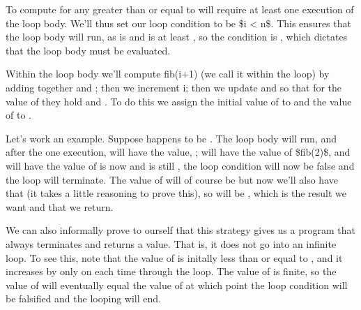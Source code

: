 \documentclass[letterpaper,10pt,english]{sphinxmanual}
\begin{document}
To compute  for any  greater than or equal to  will
require at least one execution of the loop body. We’ll thus set our
loop condition to be \$i \textless{} n\$. This ensures that the loop body will
run, as  is  and  is at least , so the condition 
is , which dictates that the loop body must be evaluated.

Within the loop body we’ll compute fib(i+1) (we call it  within
the loop) by adding together  and ; then we increment i;
then we update  and  so that for the  value of 
they hold  and . To do this we assign the initial
value of  to  and the value of  to .

Let’s work an example. Suppose  happens to be . The loop body
will run, and after the one execution,  will have the value, ;
 will have the value of \$fib(2)\$, and  will have the value
of  is now  and  is still , the loop
condition will now be false and the loop will terminate. The value of
 will of course be  but now we’ll also have that  (it takes a little reasoning to prove this), so  will be
, which is the result we want and that we return.

We can also informally prove to ourself that this strategy gives us
a program that always terminates and returns a value. That is, it does
not go into an infinite loop. To see this, note that the value of 
is initally less than or equal to , and it increases by only  on
each time through the loop. The value of  is finite, so the value
of  will eventually equal the value of  at which point the loop
condition will be falsified and the looping will end.
\end{document}
